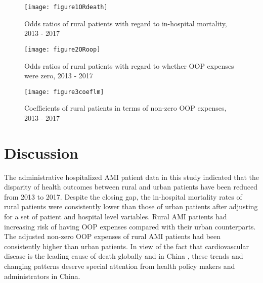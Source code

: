 \documentclass[ijerph,article,submit,moreauthors,pdftex,10pt,a4paper]{mdpi}
\theoremstyle{mdpi}
\newcounter{ex}
\newcounter{re}
\theoremstyle{mdpidefinition}
\begin{document}
\begin{figure}[H]
\caption{Odds ratios of rural patients with regard to in-hospital mortality, 2013 - 2017}
\centering
\texttt{[image: figure1ORdeath]}\label{fig1}
\end{figure}

\begin{figure}[H]
\caption{Odds ratios of rural patients with regard to whether OOP expenses were zero, 2013 - 2017}
\centering
\texttt{[image: figure2ORoop]}\label{fig2}
\end{figure}

\begin{figure}[H]
\caption{Coefficients of rural patients in terms of non-zero OOP expenses, 2013 - 2017}
\centering
\texttt{[image: figure3coeflm]}\label{fig3}
\end{figure}

\section{Discussion}

The administrative hospitalized AMI patient data in this study indicated that the disparity of health outcomes between rural and urban patients have been reduced from 2013 to 2017. Despite the closing gap, the in-hospital mortality rates of rural patients were consistently lower than those of urban patients after adjusting for a set of patient and hospital level variables. Rural AMI patients had increasing risk of having OOP expenses compared with their urban counterparts. The adjusted non-zero OOP expenses of rural AMI patients had been consistently higher than urban patients. In view of the fact that cardiovascular disease is the leading cause of death globally and in China \cite{abubakar2015global, chung2015comparison}, these trends and changing patterns deserve special attention from health policy makers and administrators in China.
\end{document}
